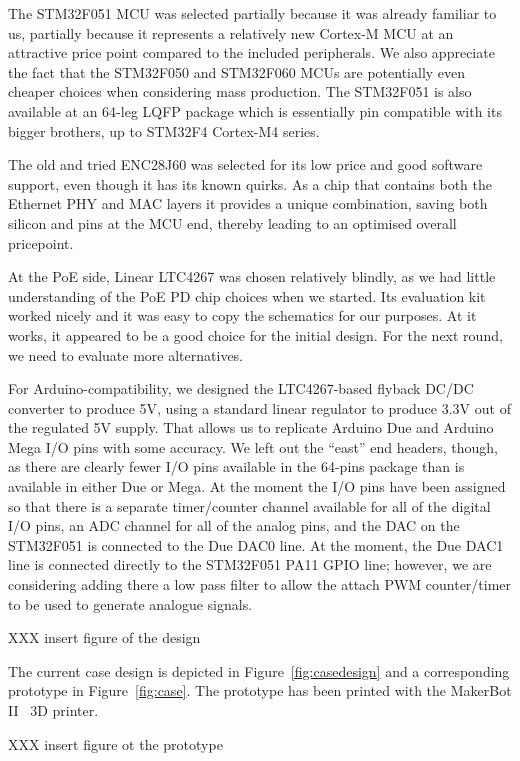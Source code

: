 \documentclass[draft,a4paper]{siamltex}
\begin{document}
The STM32F051 MCU was selected partially because it was already
familiar to us, partially because it represents a relatively new
Cortex-M MCU at an attractive price point compared to the included
peripherals.  We also appreciate the fact that the STM32F050 and
STM32F060 MCUs are potentially even cheaper choices when considering
mass production.  The STM32F051 is also available at an 64-leg LQFP
package which is essentially pin compatible with its bigger brothers,
up to STM32F4 Cortex-M4 series.

The old and tried ENC28J60 was selected for its low price and good
software support, even though it has its known quirks.  As a chip that
contains both the Ethernet PHY and MAC layers it provides a unique
combination, saving both silicon and pins at the MCU end, thereby
leading to an optimised overall pricepoint.

At the PoE side, Linear LTC4267 was chosen relatively blindly, as we
had little understanding of the PoE PD chip choices when we started.
Its evaluation kit worked nicely and it was easy to copy the
schematics for our purposes.  At it works, it appeared to be a good
choice for the initial design.  For the next round, we need to
evaluate more alternatives.

For Arduino-compatibility, we designed the LTC4267-based flyback DC/DC
converter to produce 5V, using a standard linear regulator to produce
3.3V out of the regulated 5V supply.  That allows us to replicate
Arduino Due and Arduino Mega I/O pins with some accuracy.  We left out
the ``east'' end headers, though, as there are clearly fewer I/O pins
available in the 64-pins package than is available in either Due or
Mega.  At the moment the I/O pins have been assigned so that there is
a separate timer/counter channel available for all of the digital I/O
pins, an ADC channel for all of the analog pins, and the DAC on the
STM32F051 is connected to the Due DAC0 line.  At the moment, the Due
DAC1 line is connected directly to the STM32F051 PA11 GPIO line;
however, we are considering adding there a low pass filter to allow
the attach PWM counter/timer to be used to generate analogue signals.

XXX insert figure of the design

The current case design is depicted in Figure~\ref{fig:casedesign} and
a corresponding prototype in Figure~\ref{fig:case}.  The prototype has
been printed with the MakerBot II~\cite{MakerBotII} 3D printer.

XXX insert figure ot the prototype
\end{document}
